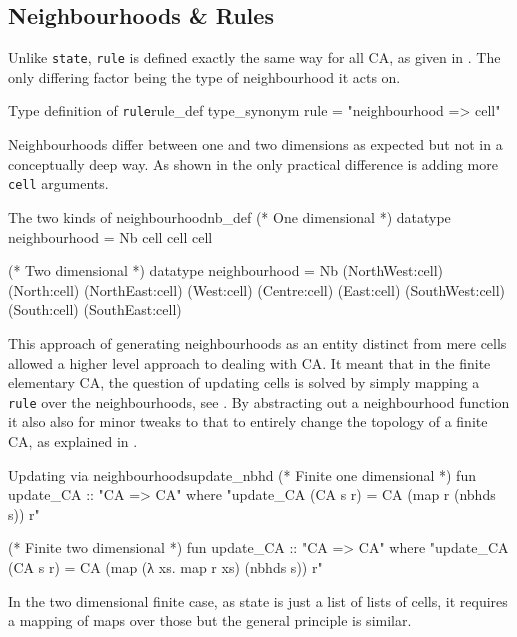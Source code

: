 \subsection{Neighbourhoods \& Rules}

Unlike \texttt{state},
\texttt{rule} is defined exactly the same way for all CA, as given in .
The only differing factor being the type of neighbourhood it acts on.

\begin{myminted}{Type definition of \texttt{rule}}{rule_def}
    type_synonym rule = "neighbourhood => cell"
\end{myminted}

Neighbourhoods differ between one and two dimensions as expected but not in a conceptually deep way.
As shown in  the only practical difference is adding more \texttt{cell} arguments.

\begin{myminted}{The two kinds of neighbourhood}{nb_def}
    (* One dimensional *)
    datatype neighbourhood = Nb cell cell cell

    (* Two dimensional *)
    datatype neighbourhood = Nb
    (NorthWest:cell) (North:cell)  (NorthEast:cell)
    (West:cell)      (Centre:cell) (East:cell)
    (SouthWest:cell) (South:cell)  (SouthEast:cell)
\end{myminted}

This approach of generating neighbourhoods as an entity distinct from mere cells allowed a higher level approach to dealing with CA.
It meant that in the finite elementary CA,
the question of updating cells is solved by simply mapping a \texttt{rule} over the neighbourhoods,
see .
By abstracting out a neighbourhood function it also also for minor tweaks to that to entirely change the topology of a finite CA,
as explained in .


\begin{myminted}{Updating via neighbourhoods}{update_nbhd}
    (* Finite one dimensional *)
    fun update_CA :: "CA => CA" where
    "update_CA (CA s r) = CA (map r (nbhds s)) r"

    (* Finite two dimensional *)
    fun update_CA :: "CA => CA" where
    "update_CA (CA s r) = CA (map (λ xs. map r xs) (nbhds s)) r"
\end{myminted}

In the two dimensional finite case,
as state is just a list of lists of cells,
it requires a mapping of maps over those but the general principle is similar.

